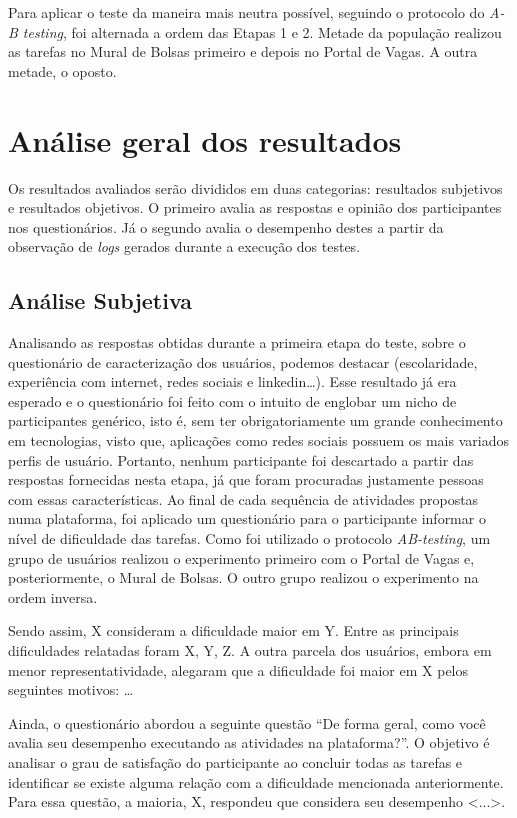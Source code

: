\documentclass[cic,tc]{iiufrgs}
\begin{document}
Para aplicar o teste da maneira mais neutra possível, seguindo o protocolo do \textit{A-B testing}, foi alternada a ordem das Etapas 1 e 2. Metade da população realizou as tarefas no Mural de Bolsas primeiro e depois no Portal de Vagas. A outra metade, o oposto.


\section{Análise geral dos resultados}
\label{avaliacaoAnalise}

Os resultados avaliados serão divididos em duas categorias: resultados subjetivos e resultados objetivos. O primeiro avalia as respostas e opinião dos participantes nos questionários. Já o segundo avalia o desempenho destes a partir da observação de \textit{logs} gerados durante a execução dos testes.


\subsection{Análise Subjetiva}
\label {avaliacaoAnaliseSubjetiva}

Analisando as respostas obtidas durante a primeira etapa do teste, sobre o questionário de caracterização dos usuários, podemos destacar (escolaridade, experiência com internet, redes sociais e linkedin…). Esse resultado já era esperado e o questionário foi feito com o intuito de englobar um nicho de participantes genérico, isto é, sem ter obrigatoriamente um grande conhecimento em tecnologias, visto que, aplicações como redes sociais possuem os mais variados perfis de usuário. Portanto, nenhum participante foi descartado a partir das respostas fornecidas nesta etapa, já que foram procuradas justamente pessoas com essas características.
Ao final de cada sequência de atividades propostas numa plataforma, foi aplicado um questionário para o participante informar o nível de dificuldade das tarefas. Como foi utilizado o protocolo \textit{AB-testing}, um grupo de usuários realizou o experimento primeiro com o Portal de Vagas e, posteriormente, o Mural de Bolsas. O outro grupo realizou o experimento na ordem inversa. 

Sendo assim, X consideram a dificuldade maior em Y. Entre as principais dificuldades relatadas foram X, Y, Z. A outra parcela dos usuários, embora em menor representatividade, alegaram que a dificuldade foi maior em X pelos seguintes motivos: …

Ainda, o questionário abordou a seguinte questão “De forma geral, como você avalia seu desempenho executando as atividades na plataforma?”. O objetivo é analisar o grau de satisfação do participante ao concluir todas as tarefas e identificar se existe alguma relação com a dificuldade mencionada anteriormente. Para essa questão, a maioria, X, respondeu que considera seu desempenho <...>.
\end{document}

